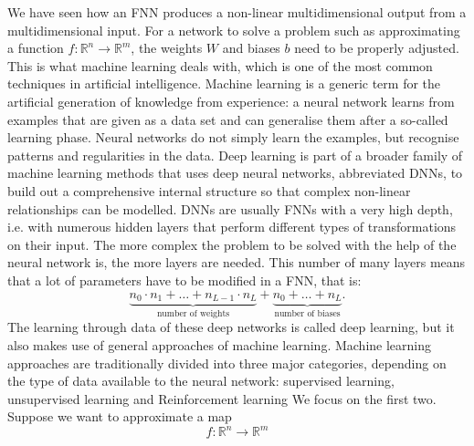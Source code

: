 We have seen how an FNN produces a non-linear multidimensional output from a multidimensional input. For a network to solve a problem such as approximating a function $f \colon \mathbb{R}^n \to \mathbb{R}^m$, the weights $W$ and biases $b$ need to be properly adjusted. This is what machine learning deals with, which is one of the most common techniques in artificial intelligence. Machine learning is a generic term for the artificial generation of knowledge from experience: a neural network learns from examples that are given as a data set and can generalise them after a so-called learning phase. Neural networks do not simply learn the examples, but recognise patterns and regularities in the data. Deep learning is part of a broader family of machine learning methods that uses deep neural networks, abbreviated DNNs, to build out a comprehensive internal structure so that complex non-linear relationships can be modelled. DNNs are usually FNNs with a very high depth, i.e. with numerous hidden layers that perform different types of transformations on their input. The more complex the problem to be solved with the help of the neural network is, the more layers are needed. This number of many layers means that a lot of parameters have to be modified in a FNN, that is:
\begin{equation*}
    \underbrace{n_0 \cdot n_1 + \ldots + n_{L-1} \cdot n_L}_{\text{number of weights}} + \underbrace{n_0 + \ldots + n_L}_{\text{number of biases}}.
\end{equation*}
The learning through data of these deep networks is called deep learning, but it also makes use of general approaches of machine learning. Machine learning approaches are traditionally divided into three major categories, depending on the type of data available to the neural network: supervised learning, unsupervised learning and Reinforcement learning We focus on the first two. \\
Suppose we want to approximate a map
\begin{equation*}
    f \colon \mathbb{R}^n \to \mathbb{R}^m
\end{equation*}

